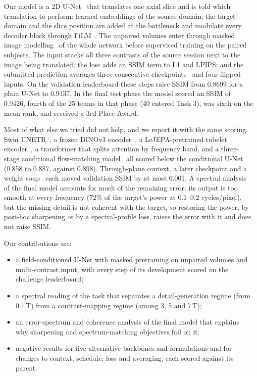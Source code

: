 \documentclass[conference]{IEEEtran}
\begin{document}
Our model is a 2D U-Net~\cite{ronneberger2015unet} that translates one axial slice and is told
which translation to perform: learned embeddings of the source domain, the target domain and the
slice position are added at the bottleneck and modulate every decoder block through
FiLM~\cite{perez2018film}. The unpaired volumes enter through masked image
modelling~\cite{he2022mae,xie2022simmim} of the whole network before supervised training on the
paired subjects. The input stacks all three contrasts of the source session next to the image
being translated; the loss adds an SSIM term to L1 and LPIPS; and the submitted prediction
averages three consecutive checkpoints~\cite{izmailov2018swa} and four flipped inputs. On the
validation leaderboard these steps raise SSIM from 0.8699 for a plain U-Net to 0.9137. In the
final test phase the model scored an SSIM of 0.9426, fourth of the 25 teams in that phase (40
entered Task 3), was sixth on the mean rank, and received a 3rd Place Award.

Most of what else we tried did not help, and we report it with the same scoring. Swin
UNETR~\cite{hatamizadeh2022swinunetr}, a frozen DINOv3 encoder~\cite{simeoni2025dinov3}, a
LeJEPA-pretrained tubelet encoder~\cite{balestriero2025lejepa}, a transformer that splits
attention by frequency band, and a three-stage conditional flow-matching
model~\cite{lipman2023flow} all scored below the conditional U-Net (0.858 to 0.887, against
0.898). Through-plane context, a later checkpoint and a weight soup~\cite{wortsman2022soups}
each moved validation SSIM by at most 0.001. A spectral analysis of the final model accounts
for much of the remaining error: its output is too smooth at every frequency (72\% of the target's power at
0.1--0.2 cycles/pixel), but the missing detail is not coherent with the target, so restoring the
power, by post-hoc sharpening or by a spectral-profile loss, raises the error with it and does
not raise SSIM.

Our contributions are:
\begin{itemize}
  \item a field-conditioned U-Net with masked pretraining on unpaired volumes and multi-contrast
        input, with every step of its development scored on the challenge leaderboard;
  \item a spectral reading of the task that separates a detail-generation regime (from 0.1\,T)
        from a contrast-mapping regime (among 3, 5 and 7\,T);
  \item an error-spectrum and coherence analysis of the final model that explains why
        sharpening and spectrum-matching objectives fail on it;
  \item negative results for five alternative backbones and formulations and for changes to
        context, schedule, loss and averaging, each scored against its parent.
\end{itemize}



\end{document}
